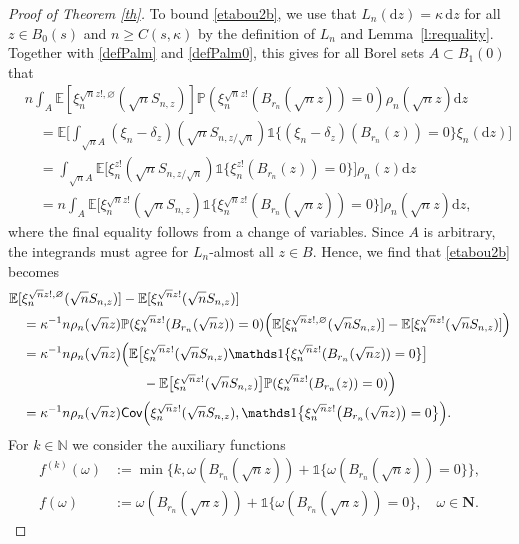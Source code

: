 \documentclass{amsart}
\theoremstyle{plain}
\theoremstyle{definition}
\theoremstyle{remark}
\def\E{\mathbb E}
\def\P{\mathbb P}
\def\one{\mathds1}
\def\Cov{\mathsf{Cov}}
\def\d{\mathrm d}
\begin{document}
\begin{proof}[Proof of Theorem \ref{th}]
 To bound \eqref{etabou2b},  we use that $L_n(\d z)= \kappa\, \d z$ for all $z \in B_0(s)$ and $n \ge C(s,\kappa)$ by the definition of $L_n$ and Lemma~\ref{l:requality}. Together with \eqref{defPalm} and \eqref{defPalm0}, this gives for all Borel sets $A \subset B_1(0)$ that 
\begin{align*}
	&n\int_A \E[\xi_n^{\sqrt n z!,\varnothing}(\sqrt{n}S_{n,z})] \P(\xi_n^{\sqrt{n}z!}(B_{r_n}(\sqrt{n}z))=0)  \rho_n(\sqrt{n}z) \d z\\
	&\quad=\E\Big[\int_{\sqrt{n} A}(\xi_n-\delta_z)(\sqrt{n}S_{n,z/\sqrt{n}}) \one\{(\xi_n-\delta_z)(B_{r_n}(z))=0\} \xi_n(\d z) \Big]\\
	&\quad=\int_{\sqrt n A} \E\Big[\xi_n^{z!} (\sqrt n S_{n,z/\sqrt n}) \one\{\xi_n^{z!}(B_{r_n}(z))=0\}\Big] \rho_n(z) \d z\\
	&\quad=n\int_{A} \E\Big[\xi_n^{\sqrt n z!} (\sqrt n S_{n,z}) \one\{\xi_n^{\sqrt n z!}(B_{r_n}(\sqrt n z))=0\}\Big] \rho_n(\sqrt n z) \d z,
\end{align*}
where the final equality follows from a change of variables. 
Since $A$ is arbitrary, the integrands must agree for $L_n$-almost all $z \in B$.
Hence, we find that \eqref{etabou2b} becomes 
\begin{align}
	&\E[ \xi_n^{\sqrt n z!,\varnothing}(\sqrt nS_{n,z})]-\E[\xi_n^{\sqrt nz!}(\sqrt nS_{n,z})]\nonumber\\
	&\quad={\kappa^{-1}n \rho_n(\sqrt n z)\P(\xi_n^{\sqrt n z!}(B_{r_n}(\sqrt nz))=0)}\Big(\E[ \xi_n^{\sqrt n z!,\varnothing}(\sqrt nS_{n,z})]-\E[\xi_n^{\sqrt nz!}(\sqrt nS_{n,z})]\Big)\nonumber\\
	&\quad={\kappa^{-1}n \rho_n(\sqrt n z)}\Big(\E \big[\xi_n^{\sqrt nz!}(\sqrt nS_{n,z}) \one\{\xi_n^{\sqrt nz!}(B_{r_n}(\sqrt nz))=0\} \big]\notag \\ & \qquad \qquad \qquad \qquad \qquad  
	-\E \big [\xi_n^{\sqrt nz!} (\sqrt nS_{n,z}) \big]\P(\xi_n^{\sqrt nz!}(B_{r_n}(z))=0)\Big)\nonumber\\
	&\quad={\kappa^{-1}n \rho_n(\sqrt n z)}\Cov\Big(\xi_n^{\sqrt nz!} (\sqrt nS_{n,z}), \one\big\{\xi_n^{\sqrt nz!}\big(B_{r_n}(\sqrt nz)\big)=0\big\} \Big). \label{covbou2}
\end{align}
For $k \in \mathbb{N}$ we consider the auxiliary functions
\begin{align*}
	f^{(k)}(\omega)&:=\min\{k,\omega(B_{r_n}(\sqrt nz))+ \one \{\omega(B_{r_n}(\sqrt nz))=0\}\},\\
	f(\omega)&:=\omega(B_{r_n}(\sqrt nz))+\one\{\omega(B_{r_n}(\sqrt nz))=0\},\quad \omega\in \mathbf{N}.

\end{align*}
\end{proof}
\end{document}
